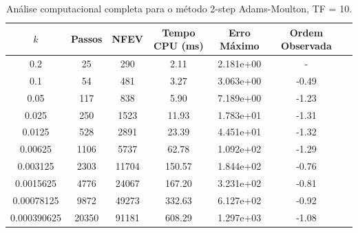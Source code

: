 \begin{table}[H]
    \centering
    \begin{tabular}{ccccccc}
        \hline
        $k$ & Passos & NFEV & Tempo CPU (ms) & Erro Máximo & Ordem Observada \\
        \hline
        0.2 & 25 & 290 & 2.11  & 2.181e+00 & - \\
        0.1 & 54 & 481 & 3.27  & 3.063e+00 & -0.49 \\
        0.05 & 117 & 838 & 5.90  & 7.189e+00 & -1.23 \\
        0.025 & 250 & 1523 & 11.93  & 1.783e+01 & -1.31 \\
        0.0125 & 528 & 2891 & 23.39  & 4.451e+01 & -1.32 \\
        0.00625 & 1106 & 5737 & 62.78  & 1.092e+02 & -1.29 \\
        0.003125 & 2303 & 11704 & 150.57  & 1.844e+02 & -0.76 \\
        0.0015625 & 4776 & 24067 & 167.20  & 3.231e+02 & -0.81 \\
        0.00078125 & 9872 & 49273 & 332.63  & 6.127e+02 & -0.92 \\
        0.000390625 & 20350 & 91181 & 608.29  & 1.297e+03 & -1.08 \\
        \hline
    \end{tabular}
    \caption{Análise computacional completa para o método 2-step Adams-Moulton, TF = 10.}
    \label{tab:erros_2-step_adams-moulton,_tf_=_10}
\end{table}
